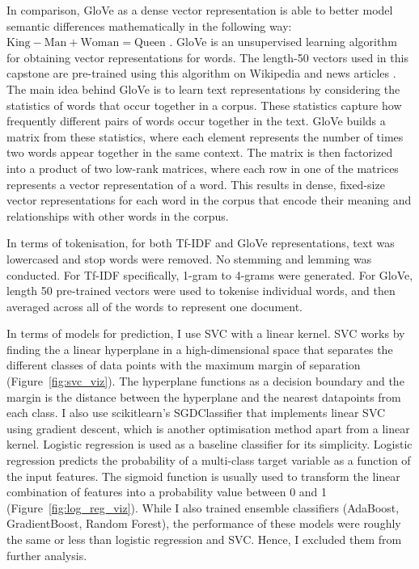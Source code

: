 In comparison, GloVe as a dense vector representation is able to better model semantic differences mathematically in the following way: $\text{King} - \text{Man} + \text{Woman} = \text{Queen}$ \cite{vector_differences_2015}. GloVe is an unsupervised learning algorithm for obtaining vector representations for words. The length-50 vectors used in this capstone are pre-trained using this algorithm on Wikipedia and news articles \cite{pennington2014glove}. The main idea behind GloVe is to learn text representations by considering the statistics of words that occur together in a corpus. These statistics capture how frequently different pairs of words occur together in the text. GloVe builds a matrix from these statistics, where each element represents the number of times two words appear together in the same context. The matrix is then factorized into a product of two low-rank matrices, where each row in one of the matrices represents a vector representation of a word. This results in dense, fixed-size vector representations for each word in the corpus that encode their meaning and relationships with other words in the corpus.

In terms of tokenisation, for both Tf-IDF and GloVe representations, text was lowercased and stop words were removed. No stemming and lemming was conducted. For Tf-IDF specifically, 1-gram to 4-grams were generated. For GloVe, length 50 pre-trained vectors were used to tokenise individual words, and then averaged across all of the words to represent one document.

In terms of models for prediction, I use SVC with a linear kernel. SVC works by finding the a linear hyperplane in a high-dimensional space that separates the different classes of data points with the maximum margin of separation (Figure~\ref{fig:svc_viz}). The hyperplane functions as a decision boundary and the margin is the distance between the hyperplane and the nearest datapoints from each class. I also use scikitlearn's SGDClassifier that implements linear SVC using gradient descent, which is another optimisation method apart from a linear kernel. Logistic regression is used as a baseline classifier for its simplicity. Logistic regression predicts the probability of a multi-class target variable as a function of the input features. The sigmoid function is usually used to transform the linear combination of features into a probability value between 0 and 1 (Figure~\ref{fig:log_reg_viz}). While I also trained ensemble classifiers (AdaBoost, GradientBoost, Random Forest), the performance of these models were roughly the same or less than logistic regression and SVC. Hence, I excluded them from further analysis.

